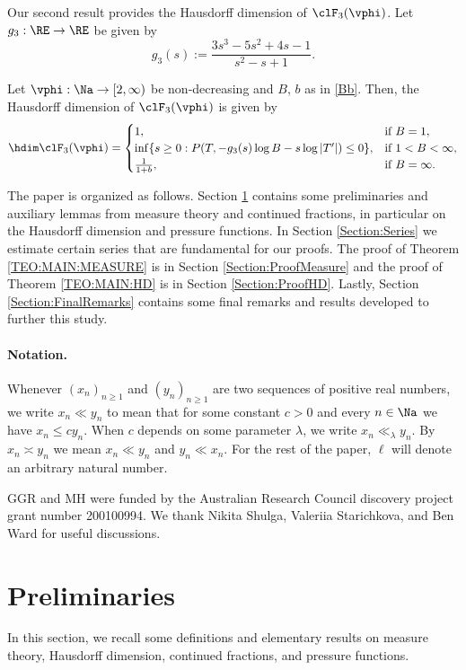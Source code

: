 \documentclass[12pt,a4paper]{amsart}
\begin{document}
Our second result provides the Hausdorff dimension of $\clF_3(\vphi)$. Let $g_3:\RE\to\RE$ be given by
\[
g_3(s)
:=
\frac{3s^3-5s^2+4s-1}{s^2-s+1}.
\]

\begin{teo01}\label{TEO:MAIN:HD}
Let $\vphi:\Na\to [2,\infty)$ be non-decreasing and $B$, $b$ as in \eqref{Bb}. Then, the Hausdorff dimension of $\clF_3(\vphi)$ is given by
\[
\hdim \clF_3(\vphi)  
=
\begin{cases}
1, &\text{\rm if }  B=1, \\
\inf\{s \geq 0: P(T,-g_3(s)\log B - s \log |T'|) \leq 0\}, &\text{\rm if }  1<B<\infty,\\
\frac{1}{1+b}, &\text{\rm if }  B=\infty.
\end{cases}  
\]
\end{teo01}



The paper is organized as follows. Section \ref{Section:Preleminaries} contains some preliminaries and auxiliary lemmas from measure theory and continued fractions, in particular on the Hausdorff dimension and pressure functions. In Section \ref{Section:Series} we estimate certain series that are fundamental for our proofs. The proof of Theorem \ref{TEO:MAIN:MEASURE} is in Section \ref{Section:ProofMeasure} and the proof of Theorem \ref{TEO:MAIN:HD} is in Section \ref{Section:ProofHD}. Lastly, Section \ref{Section:FinalRemarks} contains some final remarks and results developed to further this study.  

\paragraph{Notation.} Whenever $(x_n)_{n\geq 1}$ and $(y_n)_{n\geq 1}$ are two sequences of positive real numbers, we write $x_n\ll y_n$ to mean that for some constant $c>0$ and every $n\in\Na$ we have $x_n\leq cy_n$. When $c$ depends on some parameter $\lambda$, we write $x_n\ll_{\lambda} y_n$. By $x_n\asymp y_n$ we mean $x_n\ll y_n$ and $y_n\ll x_n$. For the rest of the paper, $\ell$ will denote an arbitrary natural number.


\medskip

GGR and MH were funded by the Australian Research Council discovery project grant number 200100994. We thank Nikita Shulga, Valeriia Starichkova, and  Ben Ward for useful discussions.
\section{Preliminaries}\label{Section:Preleminaries}
In this section, we recall some definitions and elementary results on measure theory, Hausdorff dimension, continued fractions, and pressure functions. 
\end{document}

